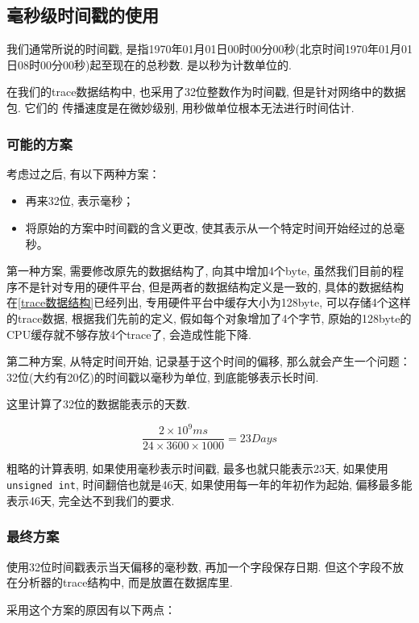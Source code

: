 \subsection{毫秒级时间戳的使用}

我们通常所说的时间戳,
是指1970年01月01日00时00分00秒(北京时间1970年01月01日08时00分00秒)起至现在的总秒数.
是以秒为计数单位的.

在我们的trace数据结构中, 也采用了32位整数作为时间戳, 但是针对网络中的数据包. 它们的
传播速度是在微妙级别, 用秒做单位根本无法进行时间估计.

\subsubsection{可能的方案}

考虑过之后, 有以下两种方案：

\begin{itemize}
\item
  再来32位, 表示毫秒；
\item
  将原始的方案中时间戳的含义更改,
  使其表示从一个特定时间开始经过的总毫秒。
\end{itemize}

第一种方案, 需要修改原先的数据结构了, 向其中增加4个byte,
虽然我们目前的程序不是针对专用的硬件平台, 但是两者的数据结构定义是一致的,
具体的数据结构在\ref{trace数据结构}已经列出,
专用硬件平台中缓存大小为128byte, 可以存储4个这样的trace数据,
根据我们先前的定义,
假如每个对象增加了4个字节, 原始的128byte的CPU缓存就不够存放4个trace了,
会造成性能下降.

第二种方案, 从特定时间开始, 记录基于这个时间的偏移, 那么就会产生一个问题：
32位(大约有20亿)的时间戳以毫秒为单位, 到底能够表示长时间.

这里计算了32位的数据能表示的天数.

$$ \frac{2 \times 10^{9} ms }{24 \times 3600 \times 1000} = 23 Days$$

粗略的计算表明, 如果使用毫秒表示时间戳, 最多也就只能表示23天,
如果使用\texttt{unsigned\ int}, 时间翻倍也就是46天,
如果使用每一年的年初作为起始, 偏移最多能表示46天, 完全达不到我们的要求.

\subsubsection{最终方案}

使用32位时间戳表示当天偏移的毫秒数, 再加一个字段保存日期.
但这个字段不放在分析器的trace结构中, 而是放置在数据库里.

采用这个方案的原因有以下两点：

